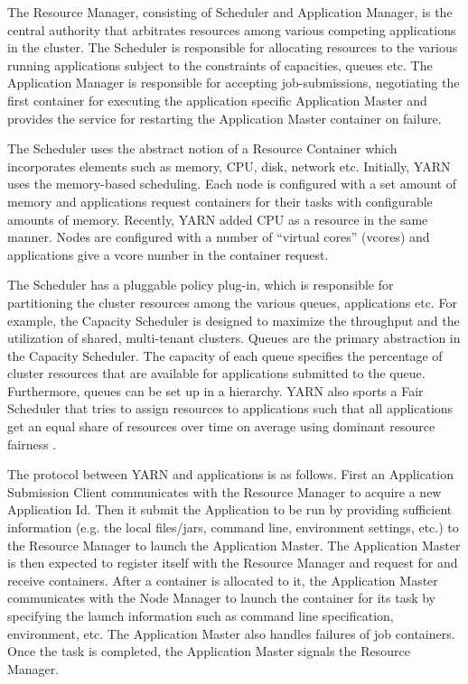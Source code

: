 \documentclass[12pt]{book}
\begin{document}
The Resource Manager, consisting of Scheduler and Application Manager, is the central authority that arbitrates resources among various competing applications in the cluster.
The Scheduler is responsible for allocating resources to the various running applications subject to the constraints of capacities, queues etc.
The Application Manager is responsible for accepting job-submissions, negotiating the first container for executing the application specific Application Master and provides the service for restarting the Application Master container on failure.

The Scheduler uses the abstract notion of a Resource Container which incorporates elements such as memory, CPU, disk, network etc. Initially, YARN uses the memory-based scheduling. Each node is configured with a set amount of memory and applications  request containers for their tasks with configurable amounts of memory. Recently, YARN added CPU as a resource in the same manner. Nodes are configured with a number of ``virtual cores'' (vcores) and applications give a vcore number in the container request.

The Scheduler has a pluggable policy plug-in, which is responsible for partitioning the cluster resources among the various queues, applications etc. For example, the Capacity Scheduler is designed to maximize the throughput and the utilization of shared, multi-tenant clusters.
Queues are the primary abstraction in the Capacity Scheduler. The capacity of each queue specifies the percentage of cluster resources that are available for applications submitted to the queue. Furthermore, queues can be set up in a hierarchy. YARN also sports a Fair Scheduler  that tries to assign resources to applications such that all applications get an equal share of resources over time on average using dominant resource fairness \cite{Ghodsi:2011:DRF}.

The protocol between YARN and applications is as follows. First an Application Submission Client communicates with the Resource Manager to acquire a new Application Id. Then it submit the Application to be run by providing sufficient information (e.g. the local files/jars, command line, environment settings, etc.) to the Resource Manager to launch the Application Master. 
The Application Master is then expected to register itself with the Resource Manager and request for and receive containers. After a container is allocated to it, the Application Master communicates with the Node Manager to launch the container for its task by specifying the launch information such as command line specification, environment, etc. The Application Master also handles failures of job containers. Once the task is completed, the Application Master signals the Resource Manager.
\end{document}
